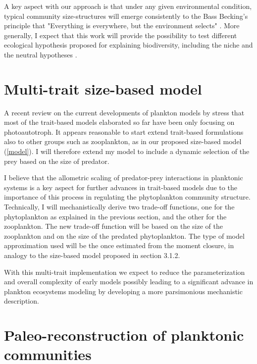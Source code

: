 A key aspect with our approach is that under any given environmental condition, typical community size-structures will emerge consistently to the Bass Becking's principle that "Everything is everywhere, but the environment selects" \citep{BaasBecking1934}. More generally, I expect that this work will provide the possibility to test different ecological hypothesis proposed for explaining biodiversity, including the niche and the neutral hypotheses \citep{Hubbell2001,Mcgill2003}.

\section{Multi-trait size-based model}
A recent review on the current developments of plankton models by \citet{Follows2011} stress that most of the trait-based models elaborated so far have been only focusing on photoautotroph. It appears reasonable to start extend trait-based formulations also to other groups such as zooplankton, as in our proposed size-based model (\ref{model}). I will therefore extend my model to include a dynamic selection of the prey based on the size of predator.

I believe that the allometric scaling of predator-prey interactions in planktonic systems is a key aspect for further advances in trait-based models due to the importance of this process in regulating the phytoplankton community structure\citep{Agrawal2001, Litchman2008}. Technically, I will mechanistically derive two trade-off functions, one for the phytoplankton as explained in the previous section, and the other for the zooplankton. The new trade-off function will be based on the size of the zooplankton and on the size of the predated phytoplankton. The type of model approximation used will be the once estimated from the moment closure, in analogy to the size-based model proposed in section 3.1.2.

With this multi-trait implementation we expect to reduce the parameterization and overall complexity of early models possibly leading to a significant advance in plankton ecosystems modeling by developing a more parsimonious mechanistic description.

\section{Paleo-reconstruction of planktonic communities}

